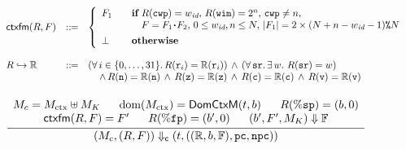 \begin{figure}[!t]
    \centering
    \[
        \begin{array}{lcl}
            \textsf{ctxfm}(R, F) & ::\!\!{=} & 
            \left\{
            \begin{array}{ll}
                F_1 & \quad \textbf{if} \
                R(\texttt{cwp}) = w_{\textit{id}}, \, 
                R(\texttt{wim}) = 2^{n}, \, 
                \texttt{cwp} \neq n, \\
                & \qquad
                F = F_1 \!\bm{\cdot}\! F_2, \, 
                0 \leq w_{\textit{id}}, n \leq N, \, 
                | F_1 | = 2 \times 
                    {(N + n - w_{\textit{id}}- 1)}\texttt{\%}{N} \\
                \\[-8pt]
                \perp & \quad \textbf{otherwise}
            \end{array} 
            \right. \\
            \\
            {R}\hookrightarrow{\mathbb{R}} & ::\!\!{=} & 
            (\forall \, i \in \{ 0, \dots, 31 \}. \, 
                R(\texttt{r}_{i}) = \mathbb{R}(\texttt{r}_{i}))
                \, \land \, 
                (\forall \, \texttt{sr}. \, \exists \, w. \  
                R(\texttt{sr}) = w) \\
            & & \quad \, \land \, 
            R(\texttt{n}) = \mathbb{R}(\texttt{n}) \, \land \, 
            R(\texttt{z}) = \mathbb{R}(\texttt{z}) \, \land \, 
            R(\texttt{c}) = \mathbb{R}(\texttt{c}) \, \land \, 
            R(\texttt{v}) = \mathbb{R}(\texttt{v}) \\
        \end{array}
    \]
    \[
        \begin{array}{c}
            \\[-5pt]
            \infer
            {
                \curStRel{(\Mem_c, (\RFile, \Wstack))}
                    {(\thrdid, ((\hRfile, \block, \hWstk), \pc, \npc))}
            }
            {
                \begin{array}{c}
                    \Mem_c = \Mem_{\text{ctx}} \uplus \Mem_K 
                    \quad \ \ 
                    \dom(\Mem_{\text{ctx}}) = \DomCtx{(\thrdid, \block)}
                    \quad \ \ 
                    \RFile(\spreg) = (\block, 0) 
                    \\
                    \ctxfm(\RFile, \Wstack) = \Wstack' \quad \ \ 
                    \RFile(\fpreg) = (\block', 0) \quad \ \ 
                    \stkRel{(\block', \Wstack', \Mem_K)}{\hWstk} 

\end{array}}
\end{array}\]
\end{figure}
